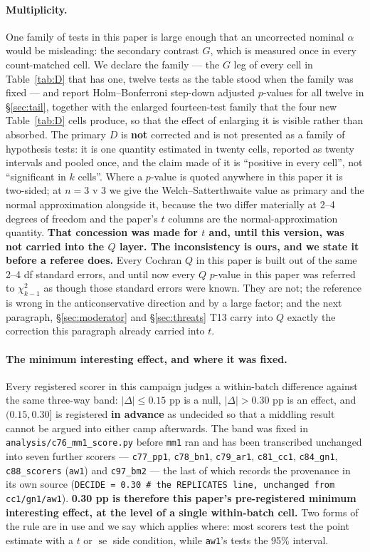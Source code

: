 \documentclass[10pt,letterpaper]{article}
\newcommand{\Dstat}{D}                         %
\newcommand{\Gstat}{G}                         %
\newcommand{\arm}[1]{\texttt{#1}}
\DeclareMathOperator{\se}{se}
\begin{document}
\paragraph{Multiplicity.}
One family of tests in this paper is large enough that an uncorrected nominal $\alpha$ would be
misleading: the secondary contrast $\Gstat$, which is measured once in every count-matched cell.
We declare the family --- the $\Gstat$ leg of every cell in Table~\ref{tab:D} that has one,
twelve tests as the table stood when the family was fixed --- and report Holm--Bonferroni
step-down adjusted $p$-values
\citep{holm1979simple} for all twelve in \S\ref{sec:tail}, together with the enlarged
fourteen-test family that the four new Table~\ref{tab:D} cells produce, so that the effect of
enlarging it is visible rather than absorbed. The primary $\Dstat$ is \textbf{not}
corrected and is not presented as a family of hypothesis tests: it is one quantity estimated in
twenty cells, reported as twenty intervals and pooled once, and the claim made of it is
``positive in every cell'', not ``significant in $k$ cells''. Where a $p$-value is quoted
anywhere in this paper it is two-sided; at $n = 3$ v $3$ we give the Welch--Satterthwaite value
as primary and the normal approximation alongside it, because the two differ materially at 2--4
degrees of freedom and the paper's $t$ columns are the normal-approximation quantity.
\textbf{That concession was made for $t$ and, until this version, was not carried into the $Q$
layer. The inconsistency is ours, and we state it before a referee does.} Every Cochran $Q$ in
this paper is built out of the same 2--4 df standard errors, and until now every $Q$ $p$-value in
this paper was referred to $\chi^2_{k-1}$ as though those standard errors were known. They are
not; the reference is wrong in the anticonservative direction and by a large factor; and the next
paragraph, \S\ref{sec:moderator} and \S\ref{sec:threats} T13 carry into $Q$ exactly the
correction this paragraph already carried into $t$.

\paragraph{The minimum interesting effect, and where it was fixed.}
Every registered scorer in this campaign judges a within-batch difference against the same
three-way band: $|\Delta| \le 0.15$ pp is a null, $|\Delta| > 0.30$ pp is an effect, and
$(0.15, 0.30]$ is registered \textbf{in advance} as undecided so that a middling result cannot be
argued into either camp afterwards. The band was fixed in \texttt{analysis/c76\_mm1\_score.py}
before \arm{mm1} ran and has been transcribed unchanged into seven further scorers ---
\texttt{c77\_pp1}, \texttt{c78\_bn1}, \texttt{c79\_ar1}, \texttt{c81\_cc1}, \texttt{c84\_gn1},
\texttt{c88\_scorers} (\arm{aw1}) and \texttt{c97\_bm2} --- the last of which records the
provenance in its own source (\texttt{DECIDE = 0.30 \# the REPLICATES line, unchanged from
cc1/gn1/aw1}). \textbf{0.30 pp is therefore this paper's pre-registered minimum interesting
effect, at the level of a single within-batch cell.} Two forms of the rule are in use and we say
which applies where: most scorers test the point estimate with a $t$ or $\se$ side condition,
while \arm{aw1}'s tests the 95\% interval.
\end{document}
